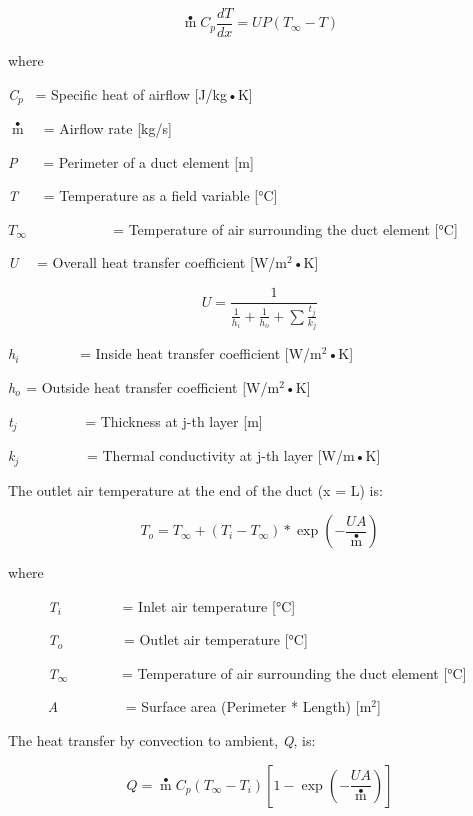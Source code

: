 \begin{equation}
\mathop m\limits^ \bullet  {C_p}\frac{{dT}}{{dx}} = UP(T{}_\infty  - T)
\end{equation}

where

\emph{C\(_{p}\)}~ = Specific heat of airflow {[}J/kg•K{]}

\(\mathop m\limits^ \bullet\) ~ = Airflow rate {[}kg/s{]}

\emph{P}~~~ = Perimeter of a duct element {[}m{]}

\emph{T}~~~ = Temperature as a field variable {[}°C{]}

\(T{}_\infty\) ~~~~~~~~~~~ = Temperature of air surrounding the duct element {[}°C{]}

\emph{U}~~ = Overall heat transfer coefficient {[}W/m\(^{2}\)•K{]}

\begin{equation}
U = \frac{1}{{\frac{1}{{{h_i}}} + \frac{1}{{{h_o}}} + \sum {\frac{{{t_j}}}{{{k_j}}}} }}
\end{equation}

\emph{h\(_{i}\)}~~~~~~~~ = Inside heat transfer coefficient {[}W/m\(^{2}\)•K{]}

\emph{h\(_{o}\)}\(_{ }\) = Outside heat transfer coefficient {[}W/m\(^{2}\)•K{]}

\emph{t\(_{j}\)}~~~~~~~~~ = Thickness at j-th layer {[}m{]}

\emph{k\(_{j}\)}~~~~~~~~~ = Thermal conductivity at j-th layer {[}W/m•K{]}

The outlet air temperature at the end of the duct (x = L) is:

\begin{equation}
{T_o} = {T_\infty } + ({T_i} - {T_\infty })*\exp \left( { - \frac{{UA}}{{\mathop {m{C_p}}\limits^ \bullet  }}} \right)
\end{equation}

where

~~~~~ \emph{T\(_{i}\)}~~~~~~~~ = Inlet air temperature {[}°C{]}

~~~~~ \emph{T\(_{o}\)}~~~~~~~~ = Outlet air temperature {[}°C{]}

~~~~~ \emph{T\(_{∞}\)}~~~~~~~ = Temperature of air surrounding the duct element {[}°C{]}

~~~~~ \emph{A}~~~~~~~~~ = Surface area (Perimeter * Length) {[}m\(^{2}\){]}

The heat transfer by convection to ambient, \emph{Q}, is:

\begin{equation}
Q = \mathop m\limits^ \bullet  {C_p}({T_\infty } - {T_i})\left[ {1 - \exp \left( { - \frac{{UA}}{{\mathop {m{C_p}}\limits^ \bullet  }}} \right)} \right]
\end{equation}

